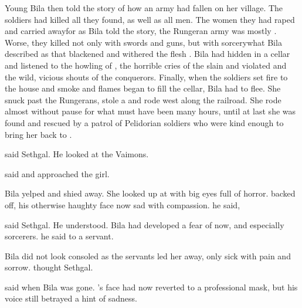 Young Bila then told the story of how an army had fallen on her village. 
The soldiers had killed all \scathae they found, as well as all \human men. 
The \human women they had raped and carried away\dash for as Bila told the story, the Rungeran army was mostly \human. 
Worse, they killed not only with swords and guns, but with sorcery\dash what Bila described as  that blackened and withered the flesh .
Bila had hidden in a cellar and listened to the howling of \daemons, the horrible cries of the slain and violated and the wild, vicious shouts of the conquerors. 
Finally, when the soldiers set fire to the house and smoke and flames began to fill the cellar, Bila had to flee. 
She snuck past the Rungerans, stole a \relc and rode west along the railroad. 
She rode almost without pause for what must have been many hours, until at last she was found and rescued by a patrol of Pelidorian soldiers who were kind enough to bring her back to \Forclin. 

 said Sethgal.
He looked at the Vaimons. 

 said \Shachar and approached the girl.

Bila yelped and shied away.
She looked up at \Shachar with big eyes full of horror. 
\Shachar backed off, his otherwise haughty face now sad with compassion.
 he said, 

 said Sethgal. 
He understood. 
Bila had developed a fear of \humans now, and especially \human sorcerers. 
 he said to a servant.

Bila did not look consoled as the servants led her away, only sick with pain and sorrow. 
 thought Sethgal.

 said \Shachar when Bila was gone.
\Shachar's face had now reverted to a professional mask, but his voice still betrayed a hint of sadness. 

